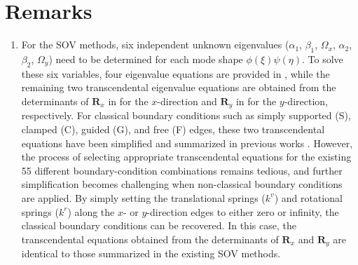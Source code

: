 \documentclass[preprint,12pt,number]{elsarticle}
\begin{document}
\section*{Remarks}
\begin{enumerate}[label=(\roman*)]
	\item For the SOV methods, six independent unknown eigenvalues ($\alpha_1$, $\beta_1$, $\Omega_x$, $\alpha_2$, $\beta_2$, $\Omega_y$) need to be determined for each mode shape $\phi(\xi)\psi(\eta)$.  
	To solve these six variables, four eigenvalue equations are provided in , while the remaining two transcendental eigenvalue equations are obtained from the determinants of $\mathbf{R}_x$ in  for the $x$-direction and $\mathbf{R}_y$ in  for the $y$-direction, respectively.
	For classical boundary conditions such as simply supported (S), clamped (C), guided (G), and free (F) edges, these two transcendental equations have been simplified and summarized in previous works \citep{xing2020extended,xing2020improved,xing2022review}.  
	However, the process of selecting appropriate transcendental equations for the existing 55 different boundary-condition combinations remains tedious, and further simplification becomes challenging when non-classical boundary conditions are applied.
	By simply setting the translational springs ($k^v$) and rotational springs ($k^r$) along the $x$- or $y$-direction edges to either zero or infinity, the classical boundary conditions can be recovered.  
	In this case, the transcendental equations obtained from the determinants of $\mathbf{R}_x$ and $\mathbf{R}_y$ are identical to those summarized in the existing SOV methods.
	

\end{enumerate}
\end{document}

